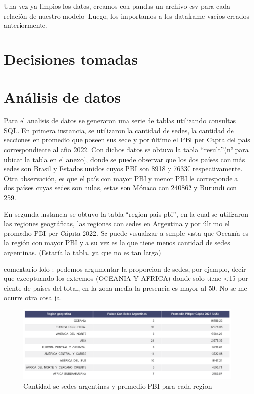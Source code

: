 \documentclass[10pt,a4paper]{article}
\begin{document}
Una vez ya limpios los datos, creamos con pandas un archivo csv para cada relación de nuestro modelo. Luego, los importamos 
a los dataframe vacíos creados anteriormente.

\section{Decisiones tomadas}


\section{Análisis de datos}
Para el analisis de datos se generaron una serie de tablas utilizando consultas SQL. En primera instancia, se  utilizaron la cantidad de sedes, la cantidad de secciones en promedio que poseen sus sede y por último el PBI per Capta del país correspondiente al año 2022. 
Con dichos datos se obtuvo la tabla “result”(n° para ubicar la tabla en el anexo), donde se puede observar que los dos países con más sedes son Brasil y Estados unidos cuyos PBI  son 8918 y 76330 respectivamente. 
Otra observación, es que el país con mayor PBI  y menor PBI   le corresponde a dos países cuyas sedes son nulas, estas son Mónaco con 240862 y Burundi con 259.


En segunda instancia se obtuvo la tabla “region-pais-pbi”, en la cual se utilizaron las regiones geográficas, las regiones con sedes en Argentina y por último el promedio PBI per Cápita 2022.
Se puede visualizar a simple vista que Oceanía es la región con mayor PBI y a su vez es la que tiene menos cantidad de sedes argentinas.
(Estaría la tabla, ya que no es tan larga)

comentario lolo : podemos argumentar la proporcion de sedes, por ejemplo, decir que exceptuando los extremos (OCEANIA Y AFRICA) donde solo tiene <15 por ciento de paises del total, en la zona media la presencia es  mayor al 50. No se me ocurre otra cosa ja.

\begin{figure}[h]
  \centering
  \includegraphics[width=1.0\textwidth]{TABLARegion.png}
  \caption{ Cantidad se sedes argentinas y promedio PBI para  cada region}
  \label{fig:Tabla 1}
\end{figure}
\end{document}
